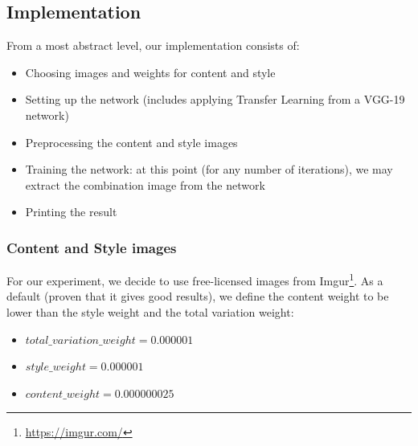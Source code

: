 \subsection{Implementation}
From a most abstract level, our implementation consists of:
\begin{itemize}
    \item Choosing images and weights for content and style
    \item Setting up the network (includes applying Transfer Learning from a VGG-19 network)
    \item Preprocessing the content and style images
    \item Training the network: at this point (for any number of iterations), we may extract the combination image from the network
    \item Printing the result
\end{itemize}
\subsubsection{Content and Style images}
For our experiment, we decide to use free-licensed images from Imgur\footnote{\href{https://imgur.com/}{https://imgur.com/}}.
As a default (proven that it gives good results), we define the content weight to be lower than the style weight and the total variation weight:
\begin{itemize}
    \item $total\_variation\_weight = 0.000001$
    \item $style\_weight = 0.000001$
    \item $content\_weight = 0.000000025$
\end{itemize}
